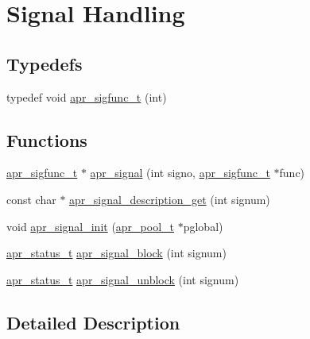 \hypertarget{group__apr__signal}{\section{Signal Handling}
\label{group__apr__signal}
}
\subsection*{Typedefs}
\begin{DoxyCompactItemize}
\item 
typedef void \hyperlink{group__apr__signal_ga2afd99d29d57dc1358aeccedb714368a}{apr\-\_\-sigfunc\-\_\-t} (int)
\end{DoxyCompactItemize}
\subsection*{Functions}
\begin{DoxyCompactItemize}
\item 
\hyperlink{group__apr__signal_ga2afd99d29d57dc1358aeccedb714368a}{apr\-\_\-sigfunc\-\_\-t} $\ast$ \hyperlink{group__apr__signal_ga77ecb509002eeb784c06014c635a9a5a}{apr\-\_\-signal} (int signo, \hyperlink{group__apr__signal_ga2afd99d29d57dc1358aeccedb714368a}{apr\-\_\-sigfunc\-\_\-t} $\ast$func)
\item 
const char $\ast$ \hyperlink{group__apr__signal_ga685b8a8e5e7a5067e3fe3456c5c1a150}{apr\-\_\-signal\-\_\-description\-\_\-get} (int signum)
\item 
void \hyperlink{group__apr__signal_ga76f1701a2f33697425b3fa6fa44a192b}{apr\-\_\-signal\-\_\-init} (\hyperlink{group__apr__pools_gaf137f28edcf9a086cd6bc36c20d7cdfb}{apr\-\_\-pool\-\_\-t} $\ast$pglobal)
\item 
\hyperlink{group__apr__errno_gaf76ee4543247e9fb3f3546203e590a6c}{apr\-\_\-status\-\_\-t} \hyperlink{group__apr__signal_ga111744ccf1db400150bf7c14c2cfc312}{apr\-\_\-signal\-\_\-block} (int signum)
\item 
\hyperlink{group__apr__errno_gaf76ee4543247e9fb3f3546203e590a6c}{apr\-\_\-status\-\_\-t} \hyperlink{group__apr__signal_ga9d8a1d786de4ace76f711806e9e34071}{apr\-\_\-signal\-\_\-unblock} (int signum)
\end{DoxyCompactItemize}


\subsection{Detailed Description}


